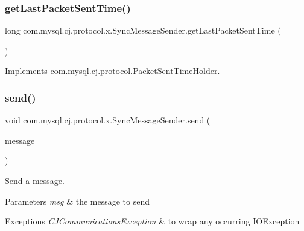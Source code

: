 \subsubsection{\texorpdfstring{get\+Last\+Packet\+Sent\+Time()}{getLastPacketSentTime()}}
{\footnotesize\ttfamily long com.\+mysql.\+cj.\+protocol.\+x.\+Sync\+Message\+Sender.\+get\+Last\+Packet\+Sent\+Time (\begin{DoxyParamCaption}{ }\end{DoxyParamCaption})}



Implements \mbox{\hyperlink{interfacecom_1_1mysql_1_1cj_1_1protocol_1_1_packet_sent_time_holder_a0f02a4b248787dd3852b5258a9aa5918}{com.\+mysql.\+cj.\+protocol.\+Packet\+Sent\+Time\+Holder}}.

\mbox{\label{classcom_1_1mysql_1_1cj_1_1protocol_1_1x_1_1_sync_message_sender_af1f0d9d9427519379b24b2fb991d4ea7}} 
\subsubsection{\texorpdfstring{send()}{send()}\hspace{0.1cm}{\footnotesize\ttfamily [1/2]}}
{\footnotesize\ttfamily void com.\+mysql.\+cj.\+protocol.\+x.\+Sync\+Message\+Sender.\+send (\begin{DoxyParamCaption}\item[{\mbox{\hyperlink{classcom_1_1mysql_1_1cj_1_1protocol_1_1x_1_1_x_message}{X\+Message}}}]{message }\end{DoxyParamCaption})}

Send a message.


\begin{DoxyParams}{Parameters}
{\em msg} & the message to send \\
\hline
\end{DoxyParams}

\begin{DoxyExceptions}{Exceptions}
{\em C\+J\+Communications\+Exception} & to wrap any occurring I\+O\+Exception \\
\hline
\end{DoxyExceptions}
\mbox{\label{classcom_1_1mysql_1_1cj_1_1protocol_1_1x_1_1_sync_message_sender_a3fdd323d523578fb3c30b25eda718c0c}} 

